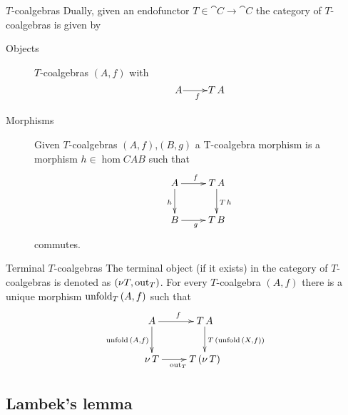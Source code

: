 \documentclass[handout]{beamer}
\begin{document}
\begin{frame}
  \begin{block}{$T$-coalgebras}
    Dually, given an endofunctor $T\in\cat{C}\to\cat{C}$ the category 
    of $T$-coalgebras is given by
    \begin{description}
    \item[Objects] $T$-coalgebras $(A,f)$ with
      \[ \xymatrix@1{A \ar[r]_f & T\,A} \]

    \item[Morphisms] Given $T$-coalgebras $(A,f)$,$(B,g)$ a T-coalgebra morphism
      is a morphism $h\in\hom{C}{A}{B}$ such that
      \[ \xymatrix{A \ar[r]^f\ar[d]_{h} & T\,A\ar[d]^{T\,h} \\
        B \ar[r]_g & T\,B } \]
      commutes.
    \end{description}
  \end{block}
\end{frame}

\begin{frame}{}
  \begin{block}{Terminal $T$-coalgebras}
    The terminal object (if it exists) in the category of $T$-coalgebras
    is denoted as $(\nu T,\mathrm{out}_T)$. For every $T$-coalgebra $(A,f)$ there is a unique 
    morphism $\mathrm{unfold}_T\,(A,f)$ such that
    \[ \xymatrix{
      A\ar[d]_{\unfold\,(A,f)} \ar[r]^f & T\,A\ar[d]^{T\,(\unfold\,(X,f))} \\
      \nu\,T \ar[r]_{\out_T}  & T\,(\nu\,T) 
    } \]
  \end{block}
\end{frame}

\subsection{Lambek's lemma}
\end{document}

